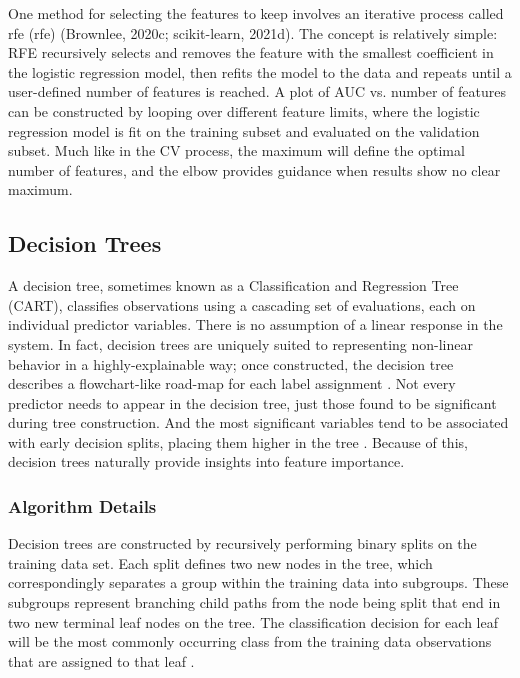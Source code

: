 One method for selecting the features to keep involves an iterative process called \acrlong{rfe} (\acrshort{rfe}) (Brownlee, 2020c; scikit-learn, 2021d). The concept is relatively simple: RFE recursively selects and removes the feature with the smallest coefficient in the logistic regression model, then refits the model to the data and repeats until a user-defined number of features is reached.  A plot of AUC vs. number of features can be constructed by looping over different feature limits, where the logistic regression model is fit on the training subset and evaluated on the validation subset. Much like in the CV process, the maximum will define the optimal number of features, and the elbow provides guidance when results show no clear maximum.

\subsection{Decision Trees}\label{ch3:decision_trees}
A decision tree, sometimes known as a Classification and Regression Tree (CART), classifies observations using a cascading set of evaluations, each on individual predictor variables. There is no assumption of a linear response in the system. In fact, decision trees are uniquely suited to representing non-linear behavior in a highly-explainable way; once constructed, the decision tree describes a flowchart-like road-map for each label assignment \citep[p. 373--375]{bertsimas_analytics_2016}. Not every predictor needs to appear in the decision tree, just those found to be significant during tree construction. And the most significant variables tend to be associated with early decision splits, placing them higher in the tree \citep[p. 376]{bertsimas_analytics_2016}. Because of this, decision trees naturally provide insights into feature importance. 

\subsubsection{Algorithm Details}\label{ch3:dtree_details}
Decision trees are constructed by recursively performing binary splits on the training data set. Each split defines two new nodes in the tree, which correspondingly separates a group within the training data into subgroups. These subgroups represent branching child paths from the node being split that end in two new terminal leaf nodes on the tree. The classification decision for each leaf will be the most commonly occurring class from the training data observations that are assigned to that leaf \citep[p. 311]{james_introduction_2013}.


